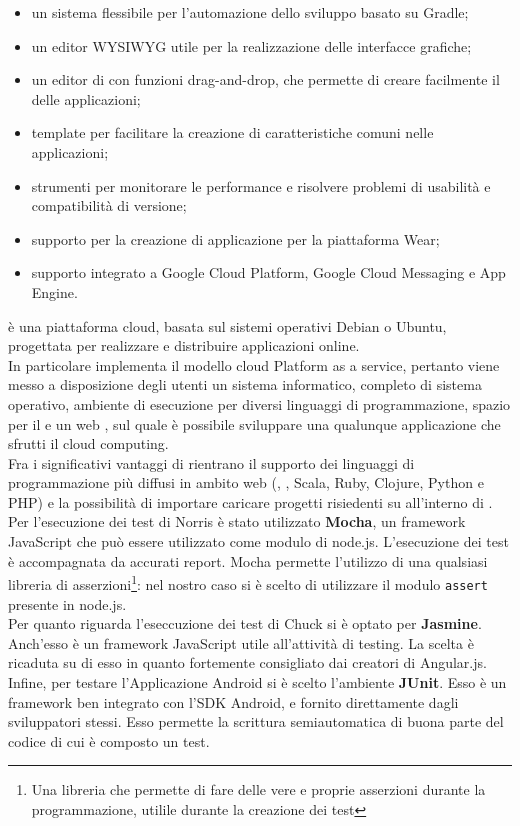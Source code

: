		\begin{itemize}
			\item un sistema flessibile per l'automazione dello sviluppo basato su Gradle;
			\item un editor WYSIWYG utile per la realizzazione delle interfacce grafiche;
			\item un editor di  con funzioni drag-and-drop, che permette di creare facilmente il  delle applicazioni;
			\item template per facilitare la creazione di caratteristiche comuni nelle applicazioni;
			\item strumenti per monitorare le performance e risolvere problemi di usabilità e compatibilità di versione;
			\item supporto per la creazione di applicazione per la piattaforma  Wear;
			\item supporto integrato a Google Cloud Platform, Google Cloud Messaging e App Engine.
		\end{itemize}
		 è una piattaforma cloud, basata sul sistemi operativi Debian o Ubuntu, progettata per realizzare e distribuire applicazioni online. \\
		In particolare  implementa il modello cloud Platform as a service, pertanto viene messo a disposizione degli utenti un sistema informatico, completo di sistema operativo, ambiente di esecuzione per diversi linguaggi di programmazione, spazio per il  e un web , sul quale è possibile sviluppare una qualunque applicazione che sfrutti il cloud computing.\\
		Fra i significativi vantaggi di  rientrano il supporto dei linguaggi di programmazione più diffusi in ambito web (, , Scala, Ruby, Clojure, Python e PHP) e la possibilità di importare caricare progetti risiedenti su  all'interno di .
		Per l'esecuzione dei test di Norris è stato utilizzato \textbf{Mocha}, un framework JavaScript che può essere utilizzato come modulo di node.js. L'esecuzione dei test è accompagnata da accurati report. Mocha permette l'utilizzo di una qualsiasi libreria di asserzioni\footnote{Una libreria che permette di fare delle vere e proprie asserzioni durante la programmazione, utilile durante la creazione dei test}: nel nostro caso si è scelto di utilizzare il modulo \texttt{assert} presente in node.js.\\
		Per quanto riguarda l'eseccuzione dei test di Chuck si è optato per \textbf{Jasmine}. Anch'esso è un framework JavaScript utile all'attività di testing. La scelta è ricaduta su di esso in quanto fortemente consigliato dai creatori di Angular.js.\\
		Infine, per testare l'Applicazione Android si è scelto l'ambiente \textbf{JUnit}. Esso è un framework ben integrato con l'SDK Android, e fornito direttamente dagli sviluppatori stessi. Esso permette la scrittura semiautomatica di buona parte del codice di cui è composto un test.